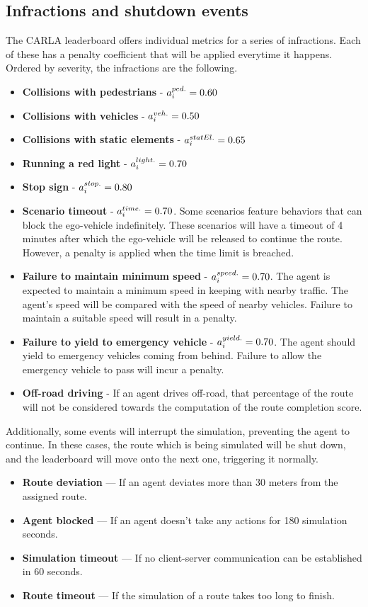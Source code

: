 \documentclass{article}
\begin{document}
\subsection{Infractions and shutdown events}
The CARLA leaderboard offers individual metrics for a series of infractions. Each of these has a penalty coefficient that will be applied everytime it happens. 
Ordered by severity, the infractions are the following.
\begin{itemize}
    \item \textbf{Collisions with pedestrians} - $a_{\small{i}}^{\small{ped.}} = 0.60$
    \item \textbf{Collisions with vehicles} - $a_{\small{i}}^{\small{veh.}} = 0.50$
    \item \textbf{Collisions with static elements} - $a_{\small{i}}^{\small{statEl.}} = 0.65$
    \item \textbf{Running a red light } - $a_{\small{i}}^{\small{light.}} = 0.70$
    \item \textbf{Stop sign} - $a_{\small{i}}^{\small{stop.}} = 0.80$
    \item \textbf{Scenario timeout} - $a_{\small{i}}^{\small{time.}} = 0.70$. Some scenarios feature behaviors that can block the ego-vehicle indefinitely. 
            These scenarios will have a timeout of 4 minutes after which the ego-vehicle will be released to continue the route. However, a penalty is applied when 
            the time limit is breached.
    \item \textbf{Failure to maintain minimum speed} - $a_{\small{i}}^{\small{speed.}} = 0.70$. The agent is expected to maintain a minimum speed in keeping with nearby traffic.
            The agent’s speed will be compared with the speed of nearby vehicles. Failure to maintain a suitable speed will result in a penalty.
    \item \textbf{Failure to yield to emergency vehicle} - $a_{\small{i}}^{\small{yield.}} = 0.70$. The agent should yield to emergency vehicles coming from behind. Failure to allow the emergency vehicle to pass will incur a penalty.
    \item \textbf{Off-road driving} - If an agent drives off-road, that percentage of the route will not be considered towards the computation of the route completion score.
\end{itemize}

Additionally, some events will interrupt the simulation, preventing the agent to continue. In these cases, the route which is being simulated will be shut down, and the 
leaderboard will move onto the next one, triggering it normally.
\begin{itemize}
    \item \textbf{Route deviation} — If an agent deviates more than 30 meters from the assigned route.
    \item \textbf{Agent blocked} — If an agent doesn’t take any actions for 180 simulation seconds.
    \item \textbf{Simulation timeout} — If no client-server communication can be established in 60 seconds.
    \item \textbf{Route timeout} — If the simulation of a route takes too long to finish.
\end{itemize}
\end{document}
